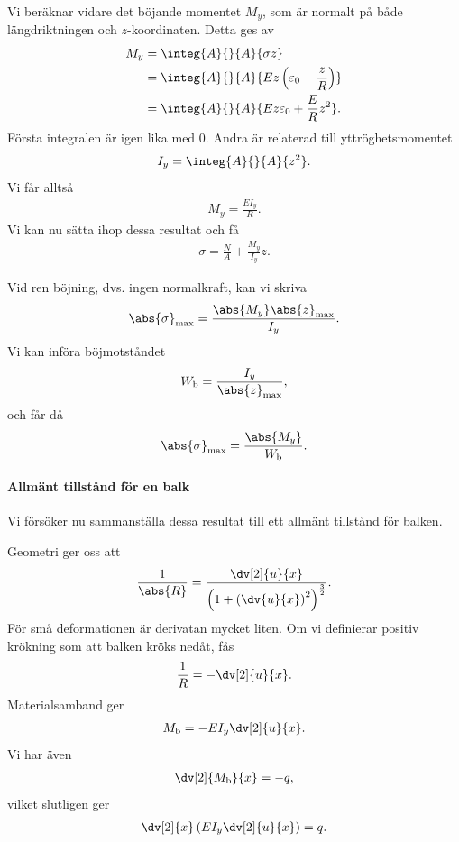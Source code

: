 Vi beräknar vidare det böjande momentet $M_{y}$, som är normalt på både längdriktningen och $z$-koordinaten. Detta ges av
\begin{align*}
	M_{y} &= \integ{A}{}{A}{\sigma z} \\
	      &= \integ{A}{}{A}{Ez\left(\varepsilon_{0} + \frac{z}{R}\right)} \\
	      &= \integ{A}{}{A}{Ez\varepsilon_{0} + \frac{E}{R}z^{2}}.
\end{align*}
Första integralen är igen lika med $0$. Andra är relaterad till yttröghetsmomentet
\begin{align*}
	I_{y} = \integ{A}{}{A}{z^{2}}.
\end{align*}
Vi får alltså
\begin{align*}
	M_{y} = \frac{EI_{y}}{R}.
\end{align*}
Vi kan nu sätta ihop dessa resultat och få
\begin{align*}
	\sigma = \frac{N}{A} + \frac{M_{y}}{I_{y}}z.
\end{align*}

Vid ren böjning, dvs. ingen normalkraft, kan vi skriva
\begin{align*}
	\abs{\sigma}_{\text{max}} = \frac{\abs{M_{y}}\abs{z}_{\text{max}}}{I_{y}}.
\end{align*}
Vi kan införa böjmotståndet
\begin{align*}
	W_{\text{b}} = \frac{I_{y}}{\abs{z}_{\text{max}}},
\end{align*}
och får då
\begin{align*}
	\abs{\sigma}_{\text{max}} = \frac{\abs{M_{y}}}{W_{\text{b}}}.
\end{align*}

\paragraph{Allmänt tillstånd för en balk}
Vi försöker nu sammanställa dessa resultat till ett allmänt tillstånd för balken.

Geometri ger oss att
\begin{align*}
	\frac{1}{\abs{R}} = \frac{\dv[2]{u}{x}}{\left(1 + \left(\dv{u}{x}\right)^{2}\right)^{\frac{3}{2}}}.
\end{align*}
För små deformationen är derivatan mycket liten. Om vi definierar positiv krökning som att balken kröks nedåt, fås
\begin{align*}
	\frac{1}{R} = -\dv[2]{u}{x}.
\end{align*}
Materialsamband ger
\begin{align*}
	M_{\text{b}} = -EI_{y}\dv[2]{u}{x}.
\end{align*}
Vi har även
\begin{align*}
	\dv[2]{M_{\text{b}}}{x} = -q,
\end{align*}
vilket slutligen ger
\begin{align*}
	\dv[2]{x}\left(EI_{y}\dv[2]{u}{x}\right) = q.
\end{align*}

